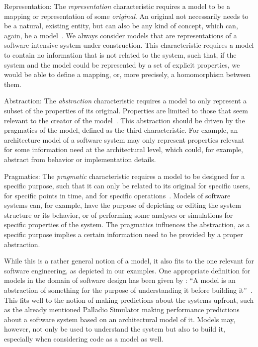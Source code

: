 \begin{properdescription}
\item[Representation:] 
The \emph{representation} characteristic requires a model to be a mapping or representation of some \emph{original}.
An original not necessarily needs to be a natural, existing entity, but can also be any kind of concept, which can, again, be a model~\cite[p.~131]{stachowiak1973modelltheorie-Book}.
We always consider models that are representations of a software-intensive system under construction.
This characteristic requires a model to contain no information that is not related to the system, such that, if the system and the model could be represented by a set of explicit properties, we would be able to define a mapping, or, more precisely, a homomorphism between them.

\item[Abstraction:] 
The \emph{abstraction} characteristic requires a model to only represent a subset of the properties of its original.
Properties are limited to those that seem relevant to the creator of the model~\cite[p.~132]{stachowiak1973modelltheorie-Book}.
This abstraction should be driven by the pragmatics of the model, defined as the third characteristic.
For example, an architecture model of a software system may only represent properties relevant for some information need at the architectural level, which could, for example, abstract from behavior or implementation details.

\item[Pragmatics:] 
The \emph{pragmatic} characteristic requires a model to be designed for a specific purpose, such that it can only be related to its original for specific users, for specific points in time, and for specific operations~\cite[pp.~132]{stachowiak1973modelltheorie-Book}.
Models of software systems can, for example, have the purpose of depicting or editing the system structure or its behavior, or of performing some analyses or simulations for specific properties of the system.
The pragmatics influences the abstraction, as a specific purpose implies a certain information need to be provided by a proper abstraction.
\end{properdescription}

While this is a rather general notion of a model, it also fits to the one relevant for software engineering, as depicted in our examples.
One appropriate definition for models in the domain of software design has been given by \citeauthor{rumbaugh2005objectoriented-Book}:
\enquote{A model is an abstraction of something for the purpose of understanding it before building it}~\cite[p.~15]{rumbaugh2005objectoriented-Book}.
This fits well to the notion of making predictions about the systems upfront, such as the already mentioned Palladio Simulator making performance predictions about a software system based on an architectural model of it.
Models may, however, not only be used to understand the system but also to build it, especially when considering code as a model as well.


